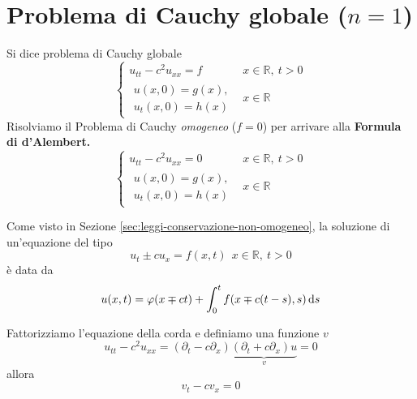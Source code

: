 \section{Problema di Cauchy globale \texorpdfstring{($n=1$)}{(n=1)}}

Si dice problema di Cauchy globale
\begin{equation*}
    \begin{cases}
        u_{tt} -c^{2} u_{xx} =f     & x\in \mathbb{R} ,\ t >0 \\
        \begin{array}{l}
            u(x,0) =g(x) , \\
            u_{t}(x,0) =h(x)
        \end{array} & x\in \mathbb{R}
    \end{cases}
\end{equation*}
Risolviamo il Problema di Cauchy \textit{omogeneo} ($f=0$) per arrivare alla \textbf{Formula di d'Alembert.}
\begin{equation*}
    \begin{cases}
        u_{tt} -c^{2} u_{xx} =0     & x\in \mathbb{R} ,\ t >0 \\
        \begin{array}{l}
            u(x,0) =g(x) , \\
            u_{t}(x,0) =h(x)
        \end{array} & x\in \mathbb{R}
    \end{cases}
\end{equation*}
\begin{nb}
    Come visto in Sezione \vref{sec:leggi-conservazione-non-omogeneo}, la soluzione di un'equazione del tipo
    \begin{equation*}
        u_{t} \pm cu_{x} =f(x,t) \ \ x\in \mathbb{R} ,\ t >0
    \end{equation*}
    è data da
    \begin{equation}
        u(x,t) =\varphi (x\mp ct) +\int ^{t}_{0} f(x \mp c(t-s) ,s) \,\mathrm d s
        \label{eq:premessa-d-alembert}
    \end{equation}
\end{nb}
Fattorizziamo l'equazione della corda e definiamo una funzione $v$
\begin{equation*}
    u_{tt} -c^{2} u_{xx} =(\partial _{t} -c\partial _{x})\underbrace{(\partial _{t} +c\partial _{x}) u}_{v} =0
\end{equation*}
allora
\begin{equation*}
    v_{t} -cv_{x} =0
\end{equation*}
